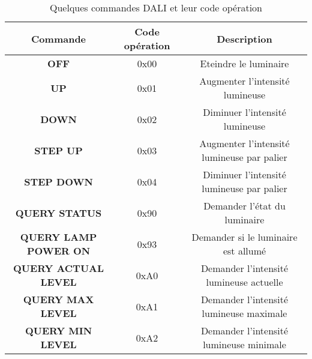 



\begin{table}[h!t]
    \begin{tabular}{|c|c|c|}
        \hline
        \textbf{Commande} & \textbf{Code opération} & \textbf{Description} \\
        \hline
        \textbf{OFF} & 0x00 & Eteindre le luminaire \\
        \textbf{UP} & 0x01 & Augmenter l'intensité lumineuse \\
        \textbf{DOWN} & 0x02 & Diminuer l'intensité lumineuse \\
        \textbf{STEP UP} & 0x03 & Augmenter l'intensité lumineuse par palier \\
        \textbf{STEP DOWN} & 0x04 & Diminuer l'intensité lumineuse par palier \\
        \hline
        \textbf{QUERY STATUS} & 0x90 & Demander l'état du luminaire \\
        \textbf{QUERY LAMP POWER ON} & 0x93 & Demander si le luminaire est allumé \\
        \textbf{QUERY ACTUAL LEVEL} & 0xA0 & Demander l'intensité lumineuse actuelle \\
        \textbf{QUERY MAX LEVEL} & 0xA1 & Demander l'intensité lumineuse maximale \\
        \textbf{QUERY MIN LEVEL} & 0xA2 & Demander l'intensité lumineuse minimale \\\hline
    \end{tabular}
    \caption{Quelques commandes DALI et leur code opération}
\end{table}

